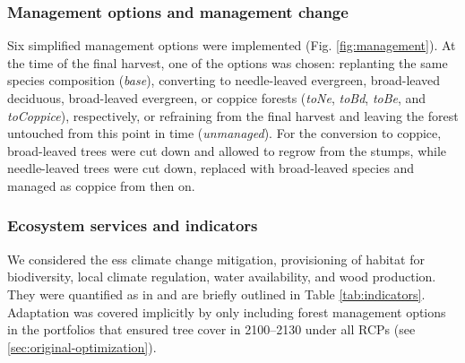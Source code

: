 \documentclass[]{article}
\begin{document}
\subsubsection{Management options and management change}\label{sec:management-options}

Six simplified management options were implemented (Fig. \ref{fig:management}). At the time of the final harvest, one of the options was chosen: replanting the same species composition (\textit{base}), converting to needle-leaved evergreen, broad-leaved deciduous, broad-leaved evergreen, or coppice forests (\textit{toNe}, \textit{toBd}, \textit{toBe}, and \textit{toCoppice}), respectively, or refraining from the final harvest and leaving the forest untouched from this point in time (\textit{unmanaged}). For the conversion to coppice, broad-leaved trees were cut down and allowed to regrow from the stumps, while needle-leaved trees were cut down, replaced with broad-leaved species and managed as coppice from then on.




\subsubsection{Ecosystem services and indicators}

We considered the \glspl{es} climate change mitigation, provisioning of habitat for biodiversity, local climate regulation, water availability, and wood production. They were quantified as in \textcite{Gregor2022} and are briefly outlined in Table \ref{tab:indicators}. Adaptation was covered implicitly by only including forest management options in the portfolios that ensured tree cover in 2100--2130 under all RCPs (see \ref{sec:original-optimization}).
\end{document}
